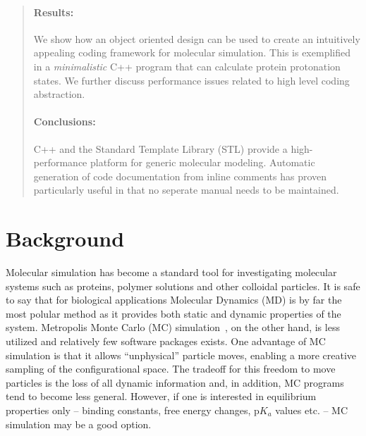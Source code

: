 \documentclass[10pt]{bmc_article}
\newenvironment{bmcformat}{\begin{raggedright}\baselineskip20pt\sloppy\setboolean{publ}{false}}{\end{raggedright}\baselineskip20pt\sloppy}
\begin{document}
\begin{bmcformat}
\begin{abstract}
        \paragraph*{Results:} We show how an object oriented design can be used to create an intuitively appealing coding framework for molecular simulation. This is exemplified in a \emph{minimalistic} C++ program that can calculate protein protonation states. We further discuss performance issues related to high level coding abstraction.

        \paragraph*{Conclusions:} C++ and the Standard Template Library (STL) provide a high-performance platform for generic molecular modeling.
        Automatic generation of code documentation from inline comments has proven particularly useful in that no seperate manual needs to be maintained.
\end{abstract}


\section*{Background}
Molecular simulation has become a standard tool for investigating molecular systems such as proteins, polymer solutions and other colloidal particles.
It is safe to say that for biological applications Molecular Dynamics (MD) is by far the most polular method as it provides both static and dynamic properties of the system.
Metropolis Monte Carlo (MC) simulation~\cite{metropolis:53}, on the other hand, is less utilized and relatively few software packages exists\cite{Kamberaj:2001fk,carlsson:01,Jie-Hu:2006lr}.
One advantage of MC simulation is that it allows ``unphysical'' particle moves, enabling a more creative sampling of the configurational space\cite{frenkel}.
The tradeoff for this freedom to move particles is the loss of all dynamic information and, in addition, MC programs tend to become less general.
However, if one is interested in equilibrium properties only -- binding constants, free energy changes, p$K_a$ values etc. -- MC simulation may be a good option.


\end{bmcformat}
\end{document}

